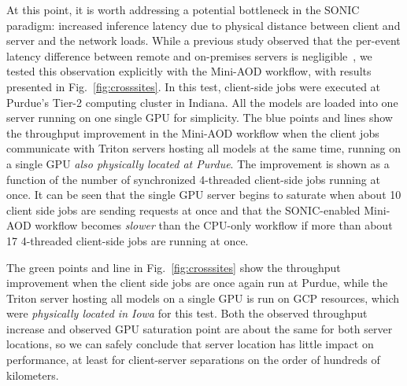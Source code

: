 At this point, it is worth addressing a potential bottleneck in the SONIC paradigm: increased inference latency due to physical distance between client and server and the network loads. While a previous study observed that the per-event latency difference between remote and on-premises servers is negligible~\cite{Krupa:2020bwg}, we tested this observation explicitly with the Mini-AOD workflow, with results presented in Fig.~\ref{fig:crosssites}. In this test, client-side jobs were executed at Purdue's Tier-2 computing cluster in Indiana. All the models are loaded into one server running on one single GPU for simplicity. The blue points and lines show the throughput improvement in the Mini-AOD workflow when the client jobs communicate with Triton servers hosting all models at the same time, running on a single GPU \textit{also physically located at Purdue}. The improvement is shown as a function of the number of synchronized 4-threaded client-side jobs running at once. It can be seen that the single GPU server begins to saturate when about 10 client side jobs are sending requests at once and that the SONIC-enabled Mini-AOD workflow becomes \textit{slower} than the CPU-only workflow if more than about 17 4-threaded client-side jobs are running at once.

The green points and line in Fig.~\ref{fig:crosssites} show the throughput improvement when the client side jobs are once again run at Purdue, while the Triton server hosting all models on a single GPU is run on GCP resources, which were \textit{physically located in Iowa} for this test. Both the observed throughput increase and observed GPU saturation point are about the same for both server locations, so we can safely conclude that server location has little impact on performance, at least for client-server separations on the order of hundreds of kilometers.


